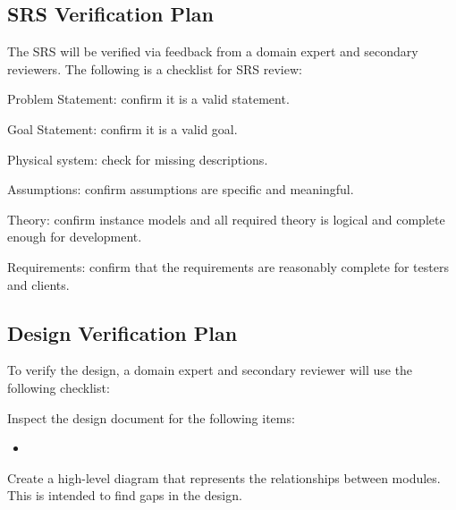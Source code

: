 \documentclass[12pt, titlepage]{article}
\begin{document}

\subsection{SRS Verification Plan}

The SRS \citep{SRS} will be verified via feedback from a domain expert and secondary reviewers. The following is a checklist for SRS review:

\begin{todolist}
    \item Problem Statement: confirm it is a valid statement.
    \item Goal Statement: confirm it is a valid goal.
    \item Physical system: check for missing descriptions.
    \item Assumptions: confirm assumptions are specific and meaningful.
    \item Theory: confirm instance models and all required theory is logical and complete enough for development.
    \item Requirements: confirm that the requirements are reasonably complete for testers and clients.
\end{todolist}




\subsection{Design Verification Plan}

To verify the design, a domain expert and secondary reviewer will use the following checklist:

\begin{todolist}
    \item Inspect the design document for the following items:
    \begin{itemize}
        \item 
    \end{itemize}
    \item Create a high-level diagram that represents the relationships between modules. This is intended to find gaps in the design.
\end{todolist}
\end{document}
